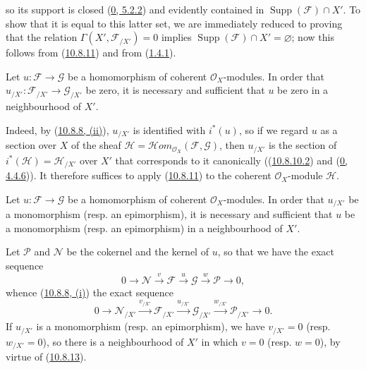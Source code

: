 
so its support is closed (\hyperref[0.5.2.2]{0, 5.2.2}) and
evidently contained in $\operatorname{Supp}(\mathscr{F})\cap X'$. To
show that it is equal to this latter set, we are immediately reduced to
proving that the relation $\Gamma(X',\mathscr{F}_{/X'})=0$ implies
$\operatorname{Supp}(\mathscr{F})\cap X'=\varnothing$; now this follows
from (\hyperref[I.10.8.11]{10.8.11}) and from
(\hyperref[I.1.4.1]{1.4.1}).

\begin{corollary}[10.8.13]
\label{I.10.8.13}
Let $u:\mathscr{F}\to\mathscr{G}$ be a homomorphism of coherent
$\mathscr{O}_X$-modules. In order that
$u_{/X'}:\mathscr{F}_{/X'}\to\mathscr{G}_{/X'}$ be zero, it is necessary
and sufficient that $u$ be zero in a neighbourhood of $X'$.
\end{corollary}

Indeed, by (\hyperref[I.10.8.8]{10.8.8, (ii)}), $u_{/X'}$
is identified with $i^*(u)$, so if we regard $u$ as a section over
$X$ of the sheaf
$\mathscr{H}=\mathscr{H}\!om_{\mathscr{O}_X}(\mathscr{F},\mathscr{G})$,
then $u_{/X'}$ is the section of
$i^*(\mathscr{H})=\mathscr{H}_{/X'}$ over $X'$ that corresponds to it
canonically ((\hyperref[I.10.8.10.2]{10.8.10.2}) and
(\hyperref[0.4.4.6]{0, 4.4.6})). It therefore suffices to apply
(\hyperref[I.10.8.11]{10.8.11}) to the coherent $\mathscr{O}_X$-module
$\mathscr{H}$.

\begin{corollary}[10.8.14]
\label{I.10.8.14}
Let $u:\mathscr{F}\to\mathscr{G}$ be a homomorphism of coherent
$\mathscr{O}_X$-modules. In order that $u_{/X'}$ be a monomorphism
(resp. an epimorphism), it is necessary and sufficient that $u$ be a
monomorphism (resp. an epimorphism) in a neighbourhood of $X'$.
\end{corollary}

Let $\mathscr{P}$ and $\mathscr{N}$ be the cokernel and the kernel of
$u$, so that we have the exact sequence
\[
  0\to\mathscr{N}\xrightarrow{v}\mathscr{F}\xrightarrow{u}
  \mathscr{G}\xrightarrow{w}\mathscr{P}\to0,
\]
whence (\hyperref[I.10.8.8]{10.8.8, (i)}) the exact sequence
\[
  0\to\mathscr{N}_{/X'}\xrightarrow{v_{/X'}}
  \mathscr{F}_{/X'}\xrightarrow{u_{/X'}}
  \mathscr{G}_{/X'}\xrightarrow{w_{/X'}}
  \mathscr{P}_{/X'}\to0.
\]
If $u_{/X'}$ is a monomorphism (resp. an epimorphism), we have
$v_{/X'}=0$ (resp. $w_{/X'}=0$), so there is a neighbourhood of $X'$ in
which $v=0$ (resp. $w=0$), by virtue of
(\hyperref[I.10.8.13]{10.8.13}).

